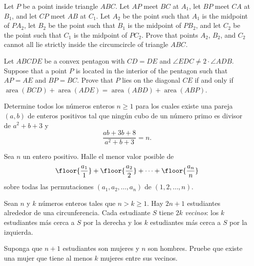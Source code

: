 \begin{probHG}[ISL 2019/G4]
  Let $P$ be a point inside triangle $ABC$. Let $AP$ meet $BC$ at $A_1$, let
  $BP$ meet $CA$ at $B_1$, and let $CP$ meet $AB$ at $C_1$. Let $A_2$ be the
  point such that $A_1$ is the midpoint of $PA_2$, let $B_2$ be the point such
  that $B_1$ is the midpoint of $PB_2$, and let $C_2$ be the point such that
  $C_1$ is the midpoint of $PC_2$. Prove that points $A_2$, $B_2$, and $C_2$
  cannot all lie strictly inside the circumcircle of triangle $ABC$.
\end{probHG}

\begin{probMG}[ISL 2019/G5]
  Let $ABCDE$ be a convex pentagon with $CD=DE$ and
  $\angle EDC\ne 2\cdot\angle ADB$. Suppose that a point $P$ is located in the
  interior of the pentagon such that $AP=AE$ and $BP=BC$. Prove that $P$ lies on
  the diagonal $CE$ if and only if
  $
    \operatorname{area}(BCD)+\operatorname{area}(ADE)
    =\operatorname{area}(ABD)+\operatorname{area}(ABP)
  $.
\end{probMG}


\begin{probEG}
  Determine todos los números enteros $n\ge 1$ para los cuales existe una pareja
  $(a,b)$ de enteros positivos tal que ningún cubo de un número primo es divisor
  de $a^2+b+3$ y
  \[\frac{ab+3b+8}{a^2+b+3}=n.\]
\end{probEG}

\begin{probEG}
  Sea $n$ un entero positivo. Halle el menor valor posible de
  \[\floor{\frac{a_1}{1}}+\floor{\frac{a_2}{2}}+\dots+\floor{\frac{a_n}{n}}\]
  sobre todas las permutaciones $(a_1,a_2,\dots,a_n)$ de $(1,2,\dots,n)$.
\end{probEG}

\begin{probH}
  Sean $n$ y $k$ números enteros tales que $n>k\ge 1$. Hay $2n+1$ estudiantes
  alrededor de una circunferencia. Cada estudiante $S$ tiene $2k$
  \emph{vecinos}: los $k$ estudiantes más cerca a $S$ por la derecha y los $k$
  estudiantes más cerca a $S$ por la izquierda.

  Suponga que $n+1$ estudiantes son mujeres y $n$ son hombres. Pruebe que existe
  una mujer que tiene al menos $k$ mujeres entre sus vecinos.
\end{probH}

